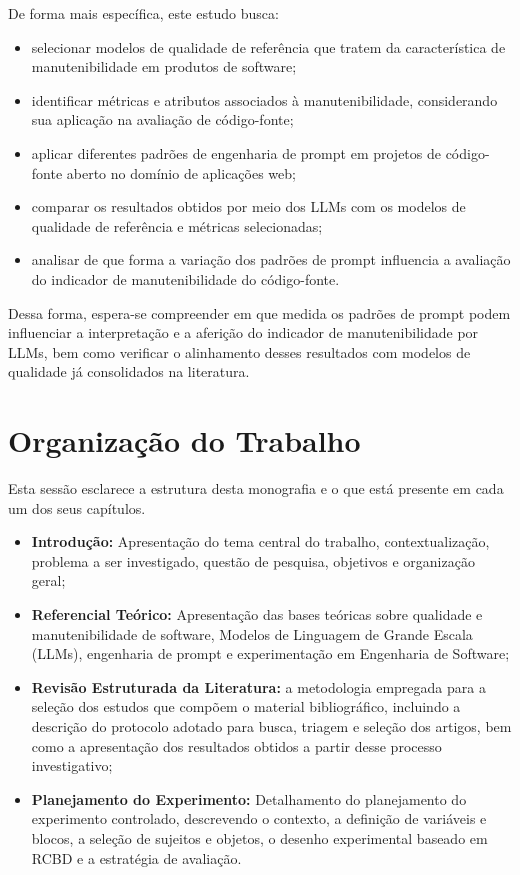 De forma mais específica, este estudo busca:

\begin{itemize}
    \item selecionar modelos de qualidade de referência que tratem da característica de manutenibilidade em produtos de software;

    \item identificar métricas e atributos associados à manutenibilidade, considerando sua aplicação na avaliação de código-fonte;

    \item aplicar diferentes padrões de engenharia de prompt em projetos de código-fonte aberto no domínio de aplicações web;

    \item comparar os resultados obtidos por meio dos LLMs com os modelos de qualidade de referência e métricas selecionadas;

    \item analisar de que forma a variação dos padrões de prompt influencia a avaliação do indicador de manutenibilidade do código-fonte.
\end{itemize}

Dessa forma, espera-se compreender em que medida os padrões de prompt podem influenciar a interpretação e a aferição do indicador de manutenibilidade por LLMs, bem como verificar o alinhamento desses resultados com modelos de qualidade já consolidados na literatura.

\section{Organização do Trabalho}

Esta sessão esclarece a estrutura desta monografia e o que está presente em cada um dos seus capítulos.

\begin{itemize}
    \item \textbf{Introdução:} Apresentação do tema central do trabalho, contextualização, problema a ser investigado, questão de pesquisa, objetivos e organização geral;
    \item \textbf{Referencial Teórico:} Apresentação das bases teóricas sobre qualidade e manutenibilidade de software, Modelos de Linguagem de Grande Escala (LLMs), engenharia de prompt e experimentação em Engenharia de Software;
    \item \textbf{Revisão Estruturada da Literatura:} a metodologia empregada para a seleção dos estudos que compõem o material bibliográfico, incluindo a descrição do protocolo adotado para busca, triagem e seleção dos artigos, bem como a apresentação dos resultados obtidos a partir desse processo investigativo;
    \item \textbf{Planejamento do Experimento:} Detalhamento do planejamento do experimento controlado, descrevendo o contexto, a definição de variáveis e blocos, a seleção de sujeitos e objetos, o desenho experimental baseado em RCBD e a estratégia de avaliação.
\end{itemize}

